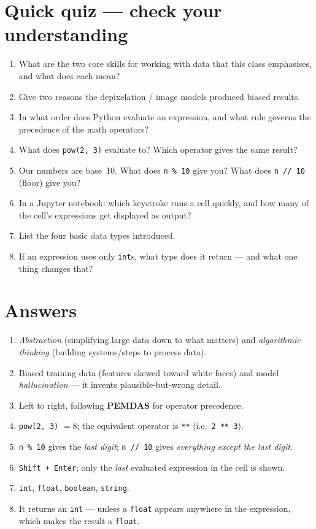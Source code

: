 \documentclass[11pt]{article}
\begin{document}
\section*{Quick quiz --- check your understanding}
\begin{enumerate}
    \item What are the two core skills for working with data that this class emphasises, and what does each mean?
    \item Give two reasons the depixelation / image models produced biased results.
    \item In what order does Python evaluate an expression, and what rule governs the precedence of the math operators?
    \item What does \verb|pow(2, 3)| evaluate to? Which operator gives the same result?
    \item Our numbers are base~10. What does \verb|n % 10| give you? What does \verb|n // 10| (floor) give you?
    \item In a Jupyter notebook: which keystroke runs a cell quickly, and how many of the cell's expressions get displayed as output?
    \item List the four basic data types introduced.
    \item If an expression uses only \texttt{int}s, what type does it return --- and what one thing changes that?
\end{enumerate}

\newpage
\section*{Answers}
\begin{enumerate}
    \item \emph{Abstraction} (simplifying large data down to what matters) and \emph{algorithmic thinking} (building systems/steps to process data).
    \item Biased training data (features skewed toward white faces) and model \emph{hallucination} --- it invents plausible-but-wrong detail.
    \item Left to right, following \textbf{PEMDAS} for operator precedence.
    \item \verb|pow(2, 3)| $= 8$; the equivalent operator is \verb|**| (i.e.\ \verb|2 ** 3|).
    \item \verb|n % 10| gives the \emph{last digit}; \verb|n // 10| gives \emph{everything except the last digit}.
    \item \texttt{Shift + Enter}; only the \emph{last} evaluated expression in the cell is shown.
    \item \texttt{int}, \texttt{float}, \texttt{boolean}, \texttt{string}.
    \item It returns an \texttt{int} --- unless a \texttt{float} appears anywhere in the expression, which makes the result a \texttt{float}.
\end{enumerate}
\end{document}
